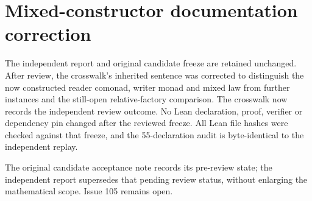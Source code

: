 \documentclass{article}
\begin{document}
\section*{Mixed-constructor documentation correction}
The independent report and original candidate freeze are retained unchanged. After review, the crosswalk's inherited sentence was corrected to distinguish the now constructed reader comonad, writer monad and mixed law from further instances and the still-open relative-factory comparison. The crosswalk now records the independent review outcome. No Lean declaration, proof, verifier or dependency pin changed after the reviewed freeze. All Lean file hashes were checked against that freeze, and the 55-declaration audit is byte-identical to the independent replay.

The original candidate acceptance note records its pre-review state; the independent report supersedes that pending review status, without enlarging the mathematical scope. Issue 105 remains open.
\end{document}
